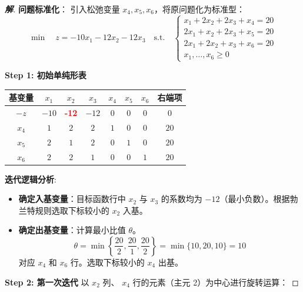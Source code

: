 \documentclass[a4paper,12pt]{ctexart} %
\newenvironment{solution}{\begin{proof}[\textbf{解}]}{\end{proof}}
\begin{document}
	\begin{solution}
		\textbf{问题标准化}：
		引入松弛变量 $x_4, x_5, x_6$，将原问题化为标准型：
		\begin{equation}
			\min \quad z = -10x_1 - 12x_2 - 12x_3 \quad \text{s.t.} \quad 
			\begin{cases} 
				x_{1}+2x_{2}+2x_{3}+x_4 = 20 \\
				2x_{1}+x_{2}+2x_{3}+x_5 = 20 \\
				2x_{1}+2x_{2}+x_{3}+x_6 = 20 \\
				x_1, \dots, x_6 \ge 0 
			\end{cases}
		\end{equation}
		
		\textbf{Step 1: 初始单纯形表}
		
		\begin{table}[H]
			\centering
			\renewcommand{\arraystretch}{1.3}
			\begin{tabular}{c|cccccc|c}
				\toprule
				\textbf{基变量} & $x_1$ & $x_2$ & $x_3$ & $x_4$ & $x_5$ & $x_6$ & \textbf{右端项} \\
				\hline
				$-z$ & $-10$ & \textcolor{red}{\textbf{-12}} & $-12$ & $0$ & $0$ & $0$ & $0$ \\
				\hline
				$x_4$ & $1$ & $2$ & $2$ & $1$ & $0$ & $0$ & $20$ \\
				$x_5$ & $2$ & $1$ & $2$ & $0$ & $1$ & $0$ & $20$ \\
				$x_6$ & $2$ & $2$ & $1$ & $0$ & $0$ & $1$ & $20$ \\
				\bottomrule
			\end{tabular}
		\end{table}
		
		\textbf{迭代逻辑分析}:
		\begin{itemize}
			\item \textbf{确定入基变量}：目标函数行中 $x_2$ 与 $x_3$ 的系数均为 $-12$（最小负数）。根据勃兰特规则选取下标较小的 \textbf{$x_2$} 入基。
			\item \textbf{确定出基变量}：计算最小比值 $\theta$。
			\[ \theta = \min \left\{ \frac{20}{2}, \frac{20}{1}, \frac{20}{2} \right\} = \min \{10, 20, 10\} = 10 \]
			对应 $x_4$ 和 $x_6$ 行。选取下标较小的 \textbf{$x_4$} 出基。
		\end{itemize}
		
		\textbf{Step 2: 第一次迭代}
		以 $x_2$ 列、 $x_4$ 行的元素（主元 2）为中心进行旋转运算：
		

\end{solution}
\end{document}
